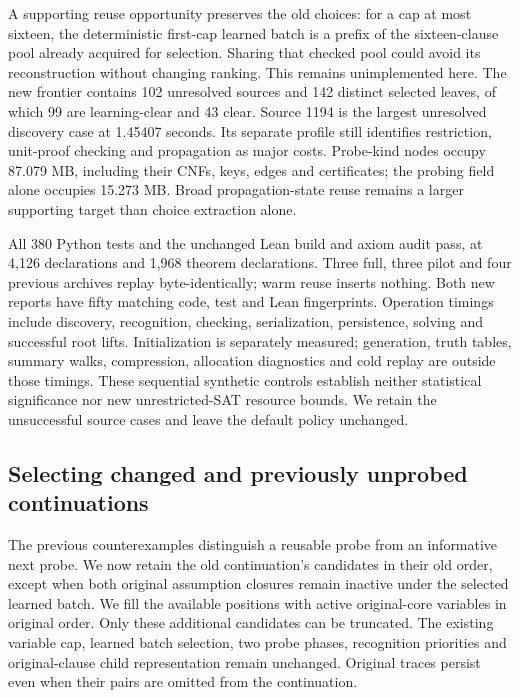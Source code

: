 \documentclass[11pt,a4paper]{article}
\numberwithin{equation}{section}
\theoremstyle{plain}
\theoremstyle{definition}
\theoremstyle{remark}
\begin{document}
A supporting reuse opportunity preserves the old choices: for a cap at most sixteen, the deterministic first-cap learned batch is a prefix of the sixteen-clause pool already acquired for selection. Sharing that checked pool could avoid its reconstruction without changing ranking. This remains unimplemented here. The new frontier contains 102 unresolved sources and 142 distinct selected leaves, of which 99 are learning-clear and 43 clear. Source 1194 is the largest unresolved discovery case at 1.45407 seconds. Its separate profile still identifies restriction, unit-proof checking and propagation as major costs. Probe-kind nodes occupy 87.079 MB, including their CNFs, keys, edges and certificates; the probing field alone occupies 15.273 MB. Broad propagation-state reuse remains a larger supporting target than choice extraction alone.

All 380 Python tests and the unchanged Lean build and axiom audit pass, at 4,126 declarations and 1,968 theorem declarations. Three full, three pilot and four previous archives replay byte-identically; warm reuse inserts nothing. Both new reports have fifty matching code, test and Lean fingerprints. Operation timings include discovery, recognition, checking, serialization, persistence, solving and successful root lifts. Initialization is separately measured; generation, truth tables, summary walks, compression, allocation diagnostics and cold replay are outside those timings. These sequential synthetic controls establish neither statistical significance nor new unrestricted-SAT resource bounds. We retain the unsuccessful source cases and leave the default policy unchanged.

\subsection{Selecting changed and previously unprobed continuations}
\label{sec:activity-continuation}

The previous counterexamples distinguish a reusable probe from an informative next probe. We now retain the old continuation's candidates in their old order, except when both original assumption closures remain inactive under the selected learned batch. We fill the available positions with active original-core variables in original order. Only these additional candidates can be truncated. The existing variable cap, learned batch selection, two probe phases, recognition priorities and original-clause child representation remain unchanged. Original traces persist even when their pairs are omitted from the continuation.
\end{document}
